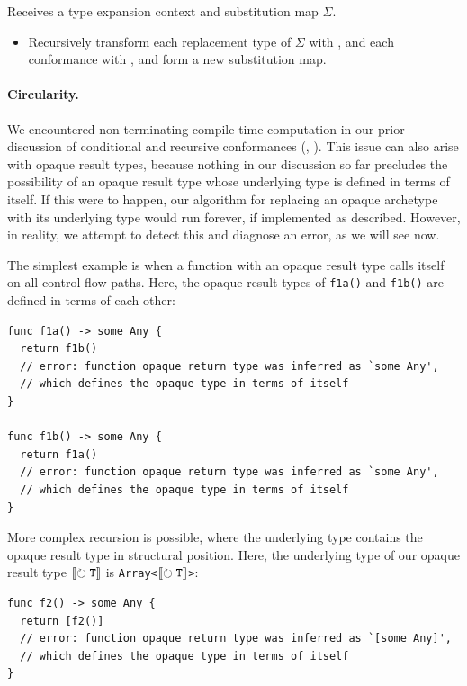 \documentclass[../generics]{subfiles}
\begin{document}
\begin{algorithm}\label{unwrap opaque substitution map algorithm}
Receives a type expansion context and substitution map $\Sigma$.
\begin{itemize}
\item Recursively transform each replacement type of $\Sigma$ with , and each conformance with , and form a new substitution map.
\end{itemize}
\end{algorithm}

\paragraph{Circularity.}
We encountered non-terminating compile-time computation in our prior discussion of conditional and recursive conformances (, ). This issue can also arise with opaque result types, because nothing in our discussion so far precludes the possibility of an opaque result type whose underlying type is defined in terms of itself. If this were to happen, our algorithm for replacing an opaque archetype with its underlying type would run forever, if implemented as described. However, in reality, we attempt to detect this and diagnose an error, as we will see now.

\begin{example}
The simplest example is when a function with an opaque result type calls itself on all control flow paths. Here, the opaque result types of \texttt{f1a()} and \texttt{f1b()} are defined in terms of each other:
\begin{Verbatim}
func f1a() -> some Any {
  return f1b()
  // error: function opaque return type was inferred as `some Any',
  // which defines the opaque type in terms of itself
}

func f1b() -> some Any {
  return f1a()
  // error: function opaque return type was inferred as `some Any',
  // which defines the opaque type in terms of itself
}
\end{Verbatim}
\end{example}
\begin{example}
More complex recursion is possible, where the underlying type contains the opaque result type in structural position. Here, the underlying type of our opaque result type $[\![\circlearrowright \texttt{\texttt{T}}]\!]$ is \texttt{Array<$[\![\circlearrowright \texttt{\texttt{T}}]\!]$>}:
\begin{Verbatim}
func f2() -> some Any {
  return [f2()]
  // error: function opaque return type was inferred as `[some Any]',
  // which defines the opaque type in terms of itself
}
\end{Verbatim}
\end{example}
\end{document}
